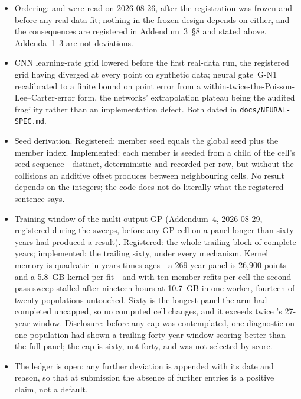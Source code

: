 \begin{itemize}
\item Ordering: \citet{dowd2010backtesting} and \citet{schnurch2022point} were
  read on 2026-08-26, after the registration was frozen and before any real-data
  fit; nothing in the frozen design depends on either, and the consequences are
  registered in Addendum~3~\S8 and stated above. Addenda~1--3 are not
  deviations.
\item CNN learning-rate grid lowered before the first real-data run, the
  registered grid having diverged at every point on synthetic data; neural
  gate~G-N1 recalibrated to a finite bound on point error from a
  within-twice-the-Poisson-Lee--Carter-error form, the networks' extrapolation
  plateau being the audited fragility rather than an implementation defect. Both
  dated in \texttt{docs/NEURAL-SPEC.md}.
\item Seed derivation. Registered: member seed equals the global seed plus the
  member index. Implemented: each member is seeded from a child of the cell's
  seed sequence---distinct, deterministic and recorded per row, but without the
  collisions an additive offset produces between neighbouring cells. No result
  depends on the integers; the code does not do literally what the registered
  sentence says.
\item Training window of the multi-output GP (Addendum~4, 2026-08-29, registered
  during the sweeps, before any GP cell on a panel longer than sixty years had
  produced a result). Registered: the whole trailing block of complete years;
  implemented: the trailing sixty, under every mechanism. Kernel memory is
  quadratic in years times ages---a 269-year panel is 26{,}900 points and a
  5.8~GB kernel per fit---and with ten member refits per cell the second-pass
  sweep stalled after nineteen hours at 10.7~GB in one worker, fourteen of
  twenty populations untouched. Sixty is the longest panel the arm had completed
  uncapped, so no computed cell changes, and it exceeds twice
  \citet{huynh2021multi}'s 27-year window. Disclosure: before any cap was
  contemplated, one diagnostic on one population had shown a trailing
  forty-year window scoring better than the full panel; the cap is sixty, not
  forty, and was not selected by score.
\item The ledger is open: any further deviation is appended with its date and
  reason, so that at submission the absence of further entries is a positive
  claim, not a default.
\end{itemize}
